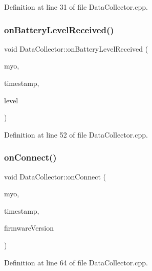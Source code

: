 Definition at line 31 of file Data\+Collector.\+cpp.

\mbox{\label{class_data_collector_a56a6c61925d54439459fc1599f76c601}} 
\subsubsection{\texorpdfstring{on\+Battery\+Level\+Received()}{onBatteryLevelReceived()}}
{\footnotesize\ttfamily void Data\+Collector\+::on\+Battery\+Level\+Received (\begin{DoxyParamCaption}\item[{myo\+::\+Myo $\ast$}]{myo,  }\item[{uint64\+\_\+t}]{timestamp,  }\item[{uint8\+\_\+t}]{level }\end{DoxyParamCaption})}



Definition at line 52 of file Data\+Collector.\+cpp.

\mbox{\label{class_data_collector_a8e6ee72005537474eb45f2a9310fa540}} 
\subsubsection{\texorpdfstring{on\+Connect()}{onConnect()}}
{\footnotesize\ttfamily void Data\+Collector\+::on\+Connect (\begin{DoxyParamCaption}\item[{myo\+::\+Myo $\ast$}]{myo,  }\item[{uint64\+\_\+t}]{timestamp,  }\item[{myo\+::\+Firmware\+Version}]{firmware\+Version }\end{DoxyParamCaption})}



Definition at line 64 of file Data\+Collector.\+cpp.

\mbox{\label{class_data_collector_a89d1d780cdf635c607707f90b0665d50}} 
